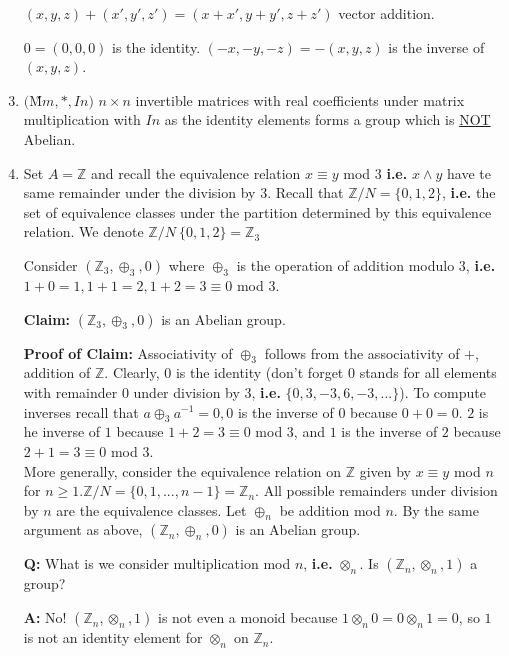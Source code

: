 \documentclass[10pt]{article}
\begin{document}
\begin{description}
\begin{enumerate}
			\item[] $(x, y, z)+(x', y', z') = (x+x', y+y', z+z')$ vector addition.
			\item[] $0 = (0, 0, 0)$ is the identity. \hspace{10mm} $(-x, -y, -z) = - (x, y, z)$ is the inverse of $(x, y, z)$.
			\item $($\~{M}$m, *, In)$ $n\times n$ invertible matrices with real coefficients under matrix multiplication with $In$ as the identity elements forms a group which is \underline{NOT} Abelian.
			\item Set $A = \mathbb{Z}$ and recall the equivalence relation $x \equiv y$ mod $3$ \textbf{i.e.} $x \land y$ have te same remainder under the division by $3$. Recall that $\mathbb{Z} / N = \{0, 1, 2\}$, \textbf{i.e.} the set of equivalence classes under the partition determined by this equivalence relation. We denote $\mathbb{Z} / N \ \{0, 1, 2\} = \mathbb{Z}_3$
			\item[] Consider $(\mathbb{Z}_3, \oplus _3, 0)$ where $\oplus _3$ is the operation of addition modulo $3$, \textbf{i.e.} $1+0=1, 1+1=2, 1+2=3 \equiv 0$ mod $3$.
			\item[\textbf{Claim:}] $(\mathbb{Z}_3, \oplus _3, 0)$ is an Abelian group.
			\item[\textbf{Proof of Claim:}] Associativity of $\oplus _3$ follows from the associativity of $+$, addition of $\mathbb{Z}$. Clearly, $0$ is the identity (don't forget $0$ stands for all elements with remainder $0$ under division by $3$, \textbf{i.e.} $\{0, 3, -3, 6, -3, ...\}$). To compute inverses recall that $a \oplus _3 a^{-1} = 0, 0$ is the inverse of $0$ because $0+0=0$. $2$ is he inverse of $1$ because $1+2=3 \equiv 0$ mod $3$, and $1$ is the inverse of $2$ because $2+1=3 \equiv 0$ mod $3$. \\
			More generally, consider the equivalence relation on $\mathbb{Z}$ given by $x \equiv y$ mod $n$ for $n \geq 1. \mathbb{Z} / N = \{0, 1, ..., n-1\} = \mathbb{Z}_n$. All possible remainders under division by $n$ are the equivalence classes. Let $\oplus _n$ be addition mod $n$. By the same argument as above, $(\mathbb{Z}_n, \oplus _n, 0)$ is an Abelian group.
			\item[\textbf{Q:}] What is we consider multiplication mod $n$, \textbf{i.e.} $\otimes _n$. Is $(\mathbb{Z}_n, \otimes _n, 1)$ a group?
			\item[\textbf{A:}] No! $(\mathbb{Z}_n, \otimes _n, 1)$ is not even a monoid because $1 \otimes _n 0 = 0 \otimes _n 1 = 0$, so $1$ is not an identity element for $\otimes _n$ on $\mathbb{Z}_n$.

\end{enumerate}
\end{description}
\end{document}
